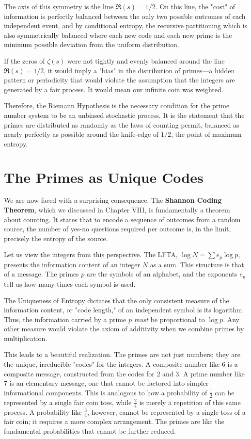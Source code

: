 \documentclass[12pt]{article}
\begin{document}
The axis of this symmetry is the line $\Re(s) = 1/2$. On this line, the "cost" of information is perfectly balanced between the only two possible outcomes of each independent event, and by conditional entropy, the recursive partitioning which is also symmetrically balanced where each new code and each new prime is the minimum possible deviation from the uniform distribution.

If the zeros of $\zeta(s)$ were not tightly and evenly balanced around the line $\Re(s) = 1/2$, it would imply a "bias" in the distribution of primes—a hidden pattern or periodicity that would violate the assumption that the integers are generated by a fair process. It would mean our infinite coin was weighted.

Therefore, the Riemann Hypothesis is the necessary condition for the prime number system to be an unbiased stochastic process. It is the statement that the primes are distributed as randomly as the laws of counting permit, balanced as nearly perfectly as possible around the knife-edge of $1/2$, the point of maximum entropy.

\section{The Primes as Unique Codes}

We are now faced with a surprising consequence. The \textbf{Shannon Coding Theorem}, which we discussed in Chapter VIII, is fundamentally a theorem about counting. It states that to encode a sequence of outcomes from a random source, the number of yes-no questions required per outcome is, in the limit, precisely the entropy of the source.

Let us view the integers from this perspective. The LFTA, $\log N = \sum e_p \log p$, presents the information content of an integer $N$ as a sum. This structure is that of a message. The primes $p$ are the symbols of an alphabet, and the exponents $e_p$ tell us how many times each symbol is used.

The Uniqueness of Entropy dictates that the only consistent measure of the information content, or "code length," of an independent symbol is its logarithm. Thus, the information carried by a prime $p$ \textit{must} be proportional to $\log p$. Any other measure would violate the axiom of additivity when we combine primes by multiplication.

This leads to a beautiful realization. The primes are not just numbers; they are the unique, irreducible "codes" for the integers. A composite number like 6 is a composite message, constructed from the codes for 2 and 3. A prime number like 7 is an elementary message, one that cannot be factored into simpler informational components. This is analogous to how a probability of $\frac{1}{2}$ can be represented by a single fair coin toss, while $\frac{2}{4}$ is merely a repetition of this same process. A probability like $\frac{3}{4}$, however, cannot be represented by a single toss of a fair coin; it requires a more complex arrangement. The primes are like the fundamental probabilities that cannot be further reduced.
\end{document}
